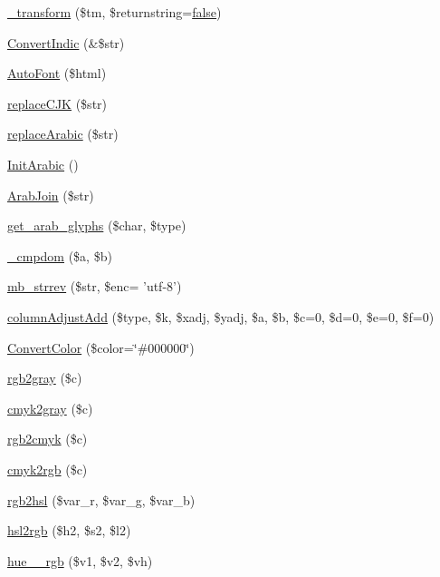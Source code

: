 \begin{DoxyCompactItemize}
\item 
\hyperlink{classm_p_d_f_a00212deafbce59a1b736a4cc41d323d0}{\-\_\-transform} (\$tm, \$returnstring=\hyperlink{ttfontsuni_8php_afbaa04e5cc97693dc668b3c45d3dd740}{false})
\item 
\hyperlink{classm_p_d_f_addb94b97bbec0a441549b13dfec26fb6}{Convert\-Indic} (\&\$str)
\item 
\hyperlink{classm_p_d_f_af91ddc3fc8d5cfe400e5fbc3c689abeb}{Auto\-Font} (\$html)
\item 
\hyperlink{classm_p_d_f_ad87e7e46d480b23c5797884e0326c757}{replace\-C\-J\-K} (\$str)
\item 
\hyperlink{classm_p_d_f_a24499de37a8c84cdcdc5de8df69c4b53}{replace\-Arabic} (\$str)
\item 
\hyperlink{classm_p_d_f_abffa74f5707720d8433707986c61e181}{Init\-Arabic} ()
\item 
\hyperlink{classm_p_d_f_abdcae9e8afcb829f66fb6230fad91aa4}{Arab\-Join} (\$str)
\item 
\hyperlink{classm_p_d_f_a5e253f0167996ae0fab572d7b4aaace6}{get\-\_\-arab\-\_\-glyphs} (\$char, \$type)
\item 
\hyperlink{classm_p_d_f_ac48b2a4b8175816f240dd2f629e09fba}{\-\_\-cmpdom} (\$a, \$b)
\item 
\hyperlink{classm_p_d_f_a45da0601c8533b2041c209b621a01847}{mb\-\_\-strrev} (\$str, \$enc= 'utf-\/8')
\item 
\hyperlink{classm_p_d_f_a58d6b107077482a91984b5378d022e29}{column\-Adjust\-Add} (\$type, \$k, \$xadj, \$yadj, \$a, \$b, \$c=0, \$d=0, \$e=0, \$f=0)
\item 
\hyperlink{classm_p_d_f_adfb97b5378508b8e3c6e71577b58067c}{Convert\-Color} (\$color=\char`\"{}\#000000\char`\"{})
\item 
\hyperlink{classm_p_d_f_a47bedd5ab35aae3ff5ff817dadc676ea}{rgb2gray} (\$c)
\item 
\hyperlink{classm_p_d_f_a755e3bf9f101d2644df9fe08a65cf5c5}{cmyk2gray} (\$c)
\item 
\hyperlink{classm_p_d_f_a4eecbd3315a7a2c8c16c3a735d0190ab}{rgb2cmyk} (\$c)
\item 
\hyperlink{classm_p_d_f_a4237ee89cf659ae69cee488cbbd678f2}{cmyk2rgb} (\$c)
\item 
\hyperlink{classm_p_d_f_a4d81cad0e1e73063720c596d9781f064}{rgb2hsl} (\$var\-\_\-r, \$var\-\_\-g, \$var\-\_\-b)
\item 
\hyperlink{classm_p_d_f_a526a4b44610f36a027293b9f777bc1f9}{hsl2rgb} (\$h2, \$s2, \$l2)
\item 
\hyperlink{classm_p_d_f_a63f33d7c460985ed75898c70445dda68}{hue\-\_\-\_\-rgb} (\$v1, \$v2, \$vh)

\end{DoxyCompactItemize}
